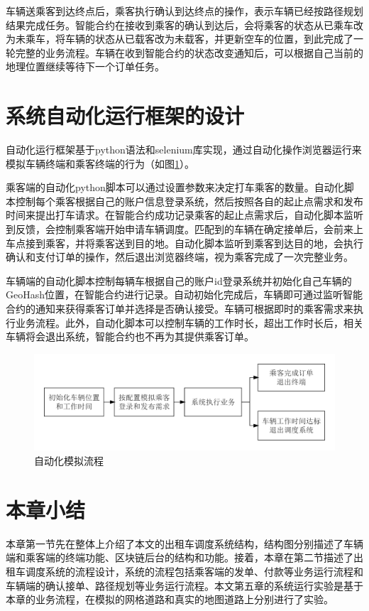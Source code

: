 车辆送乘客到达终点后，乘客执行确认到达终点的操作，表示车辆已经按路径规划结果完成任务。智能合约在接收到乘客的确认到达后，会将乘客的状态从已乘车改为未乘车，将车辆的状态从已载客改为未载客，并更新空车的位置，到此完成了一轮完整的业务流程。车辆在收到智能合约的状态改变通知后，可以根据自己当前的地理位置继续等待下一个订单任务。


\section{系统自动化运行框架的设计}
自动化运行框架基于python语法和selenium库实现，通过自动化操作浏览器运行来模拟车辆终端和乘客终端的行为（如图\ref{fig:auto}）。

乘客端的自动化python脚本可以通过设置参数来决定打车乘客的数量。自动化脚本控制每个乘客根据自己的账户信息登录系统，然后按照各自的起止点需求和发布时间来提出打车请求。在智能合约成功记录乘客的起止点需求后，自动化脚本监听到反馈，会控制乘客端开始申请车辆调度。匹配到的车辆在确定接单后，会前来上车点接到乘客，并将乘客送到目的地。自动化脚本监听到乘客到达目的地，会执行确认和支付订单的操作，然后退出浏览器终端，视为乘客完成了一次完整业务。

车辆端的自动化脚本控制每辆车根据自己的账户id登录系统并初始化自己车辆的GeoHash位置，在智能合约进行记录。自动初始化完成后，车辆即可通过监听智能合约的通知来获得乘客订单并选择是否确认接受。车辆可根据即时的乘客需求来执行业务流程。此外，自动化脚本可以控制车辆的工作时长，超出工作时长后，相关车辆将会退出系统，智能合约也不再为其提供乘客订单。
\begin{figure}[h]
  \centering
  \includegraphics[width=1.0\textwidth]{figures/自动化流程}
  \caption{自动化模拟流程}\label{fig:auto}
\end{figure}

\section{本章小结}
本章第一节先在整体上介绍了本文的出租车调度系统结构，结构图分别描述了车辆端和乘客端的终端功能、区块链后台的结构和功能。接着，本章在第二节描述了出租车调度系统的流程设计，系统的流程包括乘客端的发单、付款等业务运行流程和车辆端的确认接单、路径规划等业务运行流程。本文第五章的系统运行实验是基于本章的业务流程，在模拟的网格道路和真实的地图道路上分别进行了实验。
